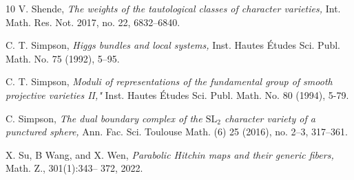 \documentclass[11pt]{amsart}
\theoremstyle{plain}
\theoremstyle{definition}
\theoremstyle{remark}
\begin{document}
\begin{thebibliography}{10}
 V. Shende, {\em The weights of the tautological classes of character varieties,} Int. Math. Res. Not. 2017, no. 22, 6832--6840.




 C. T. Simpson, {\em Higgs bundles and local systems,} Inst. Hautes \'Etudes Sci. Publ. Math. No. 75 (1992), 5--95.

 C. T. Simpson, {\em Moduli of representations of the fundamental group of smooth projective varieties II,"} Inst. Hautes \'Etudes Sci. Publ. Math.   No. 80 (1994), 5-79.


 C. Simpson, {\em The dual boundary complex of the $\mathrm{SL}_2$ character variety of a punctured sphere,} Ann. Fac. Sci. Toulouse Math. (6) 25 (2016), no. 2--3, 317--361.


 X. Su, B Wang, and X. Wen, {\em Parabolic Hitchin maps and their generic fibers,} Math. Z., 301(1):343--
372, 2022.













\end{thebibliography}
\end{document}
